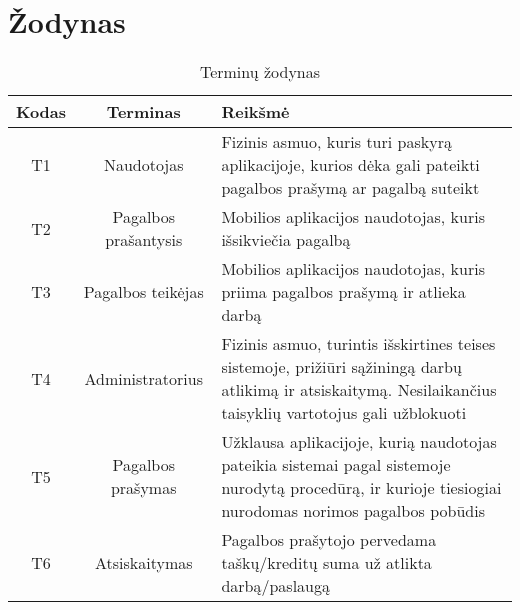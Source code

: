 \documentclass{VUMIFPSbakalaurinis}
\begin{document}
\section{Žodynas}
\begin{table}[H]\footnotesize
	\centering
	\caption{Terminų žodynas}
	{
	\setlength{\arrayrulewidth}{0.25mm}
	{\begin{tabular}{|c|c|m{11.5cm}|} \hline
	Kodas & Terminas & Reikšmė \\
	\hline
	T1 & Naudotojas & Fizinis asmuo, kuris turi paskyrą aplikacijoje, kurios dėka gali pateikti pagalbos prašymą ar pagalbą suteikt \\
	T2 & Pagalbos prašantysis & Mobilios aplikacijos naudotojas, kuris išsikviečia pagalbą \\
	T3 & Pagalbos teikėjas & Mobilios aplikacijos naudotojas, kuris  priima pagalbos prašymą ir atlieka darbą \\
	T4 & Administratorius & Fizinis asmuo, turintis išskirtines teises sistemoje, prižiūri sąžiningą darbų atlikimą ir atsiskaitymą. Nesilaikančius taisyklių vartotojus gali užblokuoti \\
	T5 & Pagalbos prašymas & Užklausa aplikacijoje, kurią naudotojas pateikia sistemai pagal sistemoje nurodytą procedūrą, ir kurioje tiesiogiai nurodomas norimos pagalbos pobūdis \\
	T6 & Atsiskaitymas & Pagalbos prašytojo pervedama taškų/kreditų suma už atlikta darbą/paslaugą \\
	\hline
	\end{tabular}}
	}
	\label{tab:table example}
\end{table}
	
\end{document}
